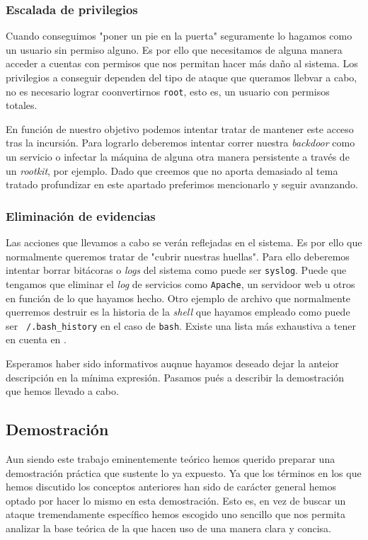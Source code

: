 \documentclass[12pt]{article}
\newcommand{\newpar} {
    \vskip 1cm
}
\begin{document}
            \subsubsection{Escalada de privilegios}
                Cuando conseguimos "poner un pie en la puerta" seguramente lo hagamos como un usuario sin permiso alguno. Es por ello que necesitamos de alguna manera acceder a cuentas con permisos que nos permitan hacer más daño al sistema. Los privilegios a conseguir dependen del tipo de ataque que queramos llebvar a cabo, no es necesario lograr coonvertirnos \texttt{root}, esto es, un usuario con permisos totales.

                \newpar

                En función de nuestro objetivo podemos intentar tratar de mantener este acceso tras la incursión. Para lograrlo deberemos intentar correr nuestra \textit{backdoor} como un servicio o infectar la máquina de alguna otra manera persistente a través de un \textit{rootkit}, por ejemplo. Dado que creemos que no aporta demasiado al tema tratado profundizar en este apartado preferimos mencionarlo y seguir avanzando.

            \subsubsection{Eliminación de evidencias}
                Las acciones que llevamos a cabo se verán reflejadas en el sistema. Es por ello que normalmente queremos tratar de "cubrir nuestras huellas". Para ello deberemos intentar borrar bitácoras o \textit{logs} del sistema como puede ser \texttt{syslog}. Puede que tengamos que eliminar el \textit{log} de servicios como \texttt{Apache}, un servidoor web u otros en función de lo que hayamos hecho. Otro ejemplo de archivo que normalmente querremos destruir es la historia de la \textit{shell} que hayamos empleado como puede ser \texttt{~/.bash_history} en el caso de \texttt{bash}. Existe una lista más exhaustiva a tener en cuenta en \cite{bib:log_files}.

            \newpar

            Esperamos haber sido informativos auqnue hayamos deseado dejar la anteior descripción en la mínima expresión. Pasamos pués a describir la demostración que hemos llevado a cabo.

        \subsection{Demostración}
            Aun siendo este trabajo eminentemente teórico hemos querido preparar una demostración práctica que sustente lo ya expuesto. Ya que los términos en los que hemos discutido los conceptos anteriores han sido de carácter general hemos optado por hacer lo mismo en esta demostración. Esto es, en vez de buscar un ataque tremendamente específico hemos escogido uno sencillo que nos permita analizar la base teórica de la que hacen uso de una manera clara y concisa.
\end{document}

